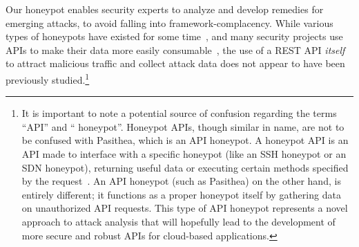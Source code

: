 Our honeypot enables security experts to analyze and develop remedies for emerging attacks, to avoid falling into framework-complacency.  
While various types of honeypots have existed for some time~\cite{Stoll:1989:CET:67554,Provos:2004:VHF:1251375.1251376}, and many security projects use APIs to make their data more easily consumable~\cite{Graham:2008:FAD:1355323,SCADA-Testbed-API}, the use of a REST API {\em itself} to attract malicious traffic and collect attack data does not appear to have been previously studied.\footnote{  
It is important to note a potential source of confusion regarding the terms ``API'' and `` honeypot''. 
Honeypot APIs, though similar in name, are not to be confused with Pasithea, which is an API honeypot. 
A honeypot API is an API made to interface with a specific honeypot (like an SSH honeypot or an SDN honeypot), returning useful data or executing certain methods specified by the request~\cite{Honeypot-API}. 
An API honeypot (such as Pasithea) on the other hand, is entirely different; it functions as a proper honeypot itself by gathering data on unauthorized API requests.  
This type of API honeypot represents a novel approach to attack analysis that will hopefully lead to the development of more secure and robust APIs for cloud-based applications.}

